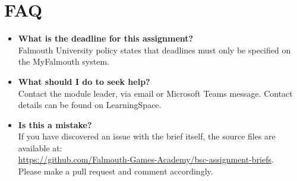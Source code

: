 \documentclass{../../fal_assignment}
\begin{document}
\section*{FAQ}

\begin{itemize}
	\item 	\textbf{What is the deadline for this assignment?} \\ 
    		Falmouth University policy states that deadlines must only be specified on the MyFalmouth system.
    		
	\item 	\textbf{What should I do to seek help?} \\ 
            Contact the module leader, via email or Microsoft Teams message. Contact details can be found on LearningSpace.
    
    	\item 	\textbf{Is this a mistake?} \\ 	
    		If you have discovered an issue with the brief itself, the source files are available at: \\
    		\url{https://github.com/Falmouth-Games-Academy/bsc-assignment-briefs}.\\
    		 Please make a pull request and comment accordingly.
\end{itemize}


\end{document}
